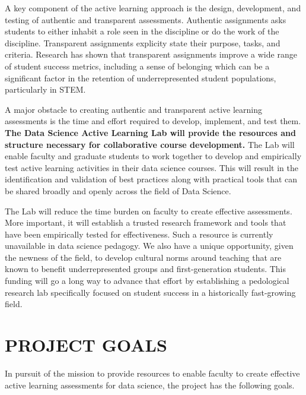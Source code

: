 \documentclass[
  letterpaper,
  DIV=11,
  numbers=noendperiod]{scrreprt}
\begin{document}
A key component of the active learning approach is the design,
development, and testing of authentic and transparent assessments.
Authentic assignments asks students to either inhabit a role seen in the
discipline or do the work of the discipline. Transparent assignments
explicity state their purpose, tasks, and criteria. Research has shown
that transparent assignments improve a wide range of student success
metrics, including a sense of belonging which can be a significant
factor in the retention of underrepresented student populations,
particularly in STEM.

A major obstacle to creating authentic and transparent active learning
assessments is the time and effort required to develop, implement, and
test them. \textbf{The Data Science Active Learning Lab will provide the
resources and structure necessary for collaborative course development.}
The Lab will enable faculty and graduate students to work together to
develop and empirically test active learning activities in their data
science courses. This will result in the identification and validation
of best practices along with practical tools that can be shared broadly
and openly across the field of Data Science.

The Lab will reduce the time burden on faculty to create effective
assessments. More important, it will establish a trusted research
framework and tools that have been empirically tested for effectiveness.
Such a resource is currently unavailable in data science pedagogy. We
also have a unique opportunity, given the newness of the field, to
develop cultural norms around teaching that are known to benefit
underrepresented groups and first-generation students. This funding will
go a long way to advance that effort by establishing a pedological
research lab specifically focused on student success in a historically
fast-growing field.

\hypertarget{project-goals}{%
\section{PROJECT GOALS}\label{project-goals}}

In pursuit of the mission to provide resources to enable faculty to
create effective active learning assessments for data science, the
project has the following goals.
\end{document}
